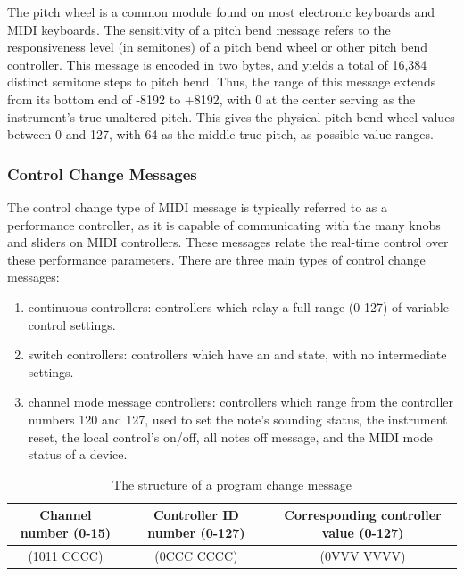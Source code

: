 The pitch wheel is a common module found on most electronic keyboards and MIDI keyboards. The sensitivity of a pitch bend message refers to the responsiveness level (in semitones) of a pitch bend wheel or other pitch bend controller. This message is encoded in two bytes\cite{McGuire_2014}, and yields a total of 16,384 distinct semitone steps to pitch bend. Thus, the range of this message extends from its bottom end of -8192 to +8192, with 0 at the center serving as the instrument's true unaltered pitch\cite{Huber_2012}. This gives the physical pitch bend wheel values between 0 and 127, with 64 as the middle true pitch, as possible value ranges.

\subsubsection{Control Change Messages}

The control change type of MIDI message is typically referred to as a performance controller, as it is capable of communicating with the many knobs and sliders on MIDI controllers. These messages relate the real-time control over these performance parameters. There are three main types of control change messages:

\begin{enumerate}
	\item continuous controllers: controllers which relay a full range (0-127) of variable control settings.
	\item switch controllers: controllers which have an  and  state, with no intermediate settings.
	\item channel mode message controllers: controllers which range from the controller numbers 120 and 127, used to set the note's sounding status, the instrument reset, the local control's on/off, all notes off message, and the MIDI mode status of a device.
\end{enumerate}

\begin{table}
	\centering
	\begin{tabular}{|c|c|c|}
	\hline
		Channel number (0-15) & Controller ID number (0-127) & Corresponding controller value (0-127) \\
		\hline
		(1011 CCCC) & (0CCC CCCC) & (0VVV VVVV) \\
	\hline
	\end{tabular}
	\caption{The structure of a program change message}
	\label{tbl:byte-structure-control-change-message}
\end{table}

